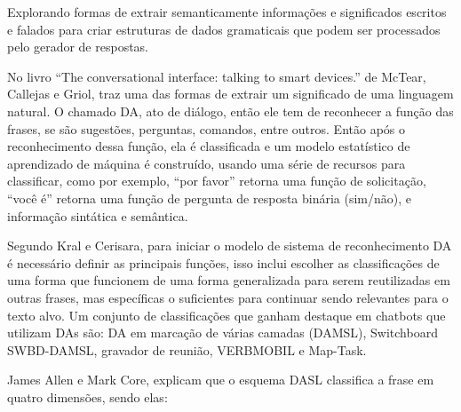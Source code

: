 \documentclass[
	12pt,				%
	oneside,
	a4paper,			%
	english,			%
	french,				%
	spanish,			%
	brazil				%
	]{abntex2}
\begin{document}
Explorando formas de extrair semanticamente informações e significados escritos e falados para criar estruturas de dados gramaticais que podem ser processados pelo gerador de respostas.

No livro “The conversational interface: talking to smart devices.” de McTear, Callejas e Griol, traz uma das formas de extrair um significado de uma linguagem natural. O chamado DA, ato de diálogo, então ele tem de reconhecer a função das frases, se são sugestões, perguntas, comandos, entre outros. Então após o reconhecimento dessa função, ela é classificada e um modelo estatístico de aprendizado de máquina é construído, usando uma série de recursos para classificar, como por exemplo, “por favor” retorna uma função de solicitação, “você é” retorna uma função de pergunta de resposta binária (sim/não), e informação sintática e semântica.

Segundo Kral e Cerisara, para iniciar o modelo de sistema de reconhecimento DA é necessário definir as principais funções, isso inclui escolher as classificações de uma forma que funcionem de uma forma generalizada para serem reutilizadas em outras frases, mas específicas o suficientes para continuar sendo relevantes para o texto alvo. Um conjunto de classificações que ganham destaque em chatbots que utilizam DAs são: DA em marcação de várias camadas (DAMSL), Switchboard SWBD-DAMSL, gravador de reunião, VERBMOBIL e Map-Task.

James Allen e Mark Core, explicam que o esquema DASL classifica a frase em quatro dimensões, sendo elas:
\end{document}
